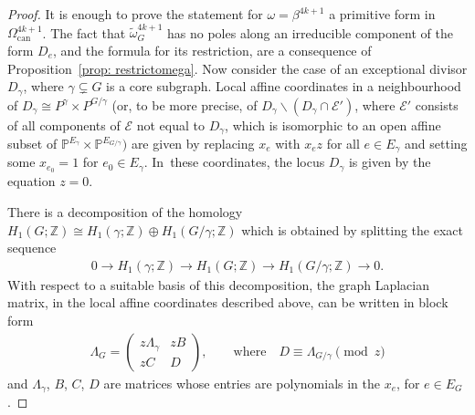 \documentclass[pdftex]{sigma}%
\numberwithin{equation}{section}
\newcommand{\To}{\longrightarrow}
\newcommand{\Z}{\mathbb Z}
\newcommand{\Pro}{\mathbb P}
\newcommand{\can}{\mathrm{can}}
\newcommand{\0}{\color{blue}{\mathsf{0}}}
\begin{document}
\begin{proof} It is enough to prove the statement for $\omega = \beta^{4k+1}$ a primitive form in $\Omega^{4k+1}_{\can}$. The fact that $\widetilde{\omega}^{4k+1}_G$ has no poles along an irreducible component of the form $D_e$, and the formula for its restriction,
are a consequence of Proposition~\ref{prop: restrictomega}. Now consider the case of an exceptional divisor $D_{\gamma}$, where $\gamma \subsetneq G$ is a core subgraph.
Local affine coordinates in a neighbourhood of $D_{\gamma} \cong P^{\gamma} \times P^{G/\gamma}$ \big(or, to be more precise, of $D_{\gamma}\backslash (D_{\gamma} \cap \mathcal{E}')$, where $\mathcal{E'}$ consists of all components of $\mathcal{E}$ not equal to $D_{\gamma}$, which is isomorphic to an open affine subset of $\Pro^{E_{\gamma}} \times \Pro^{E_{G/\gamma}}\big)$ are given by replacing $x_{e}$ with $x_{e} z$ for all $e\in E_{\gamma}$ \cite[Section~5.3]{Cosmic} and setting some $x_{e_0}=1$ for $e_0 \in E_{\gamma}$. In~these coordinates, the locus $D_{\gamma}$ is given by the equation $z=0$.

There is a decomposition of the homology
$H_1(G; \Z) \cong H_1(\gamma; \Z) \oplus H_1(G/\gamma;\Z)$
which is obtained by splitting the exact sequence
\begin{gather*}
0 \To H_1(\gamma;\Z) \To H_1(G;\Z) \To H_1(G/\gamma; \Z) \To 0 .
\end{gather*}
With respect to a suitable basis of this decomposition, the graph Laplacian matrix, in the local affine coordinates described above, can be written in block form
\begin{gather*}
\Lambda_G = \begin{pmatrix} z \Lambda_{\gamma} & z B \\ z C & D \end{pmatrix}\!, \qquad \text{where} \quad D \equiv \Lambda_{G/\gamma} \pmod{z}
\end{gather*}
and $\Lambda_{\gamma}$, $B$, $C$, $D$ are matrices whose entries are polynomials in the $x_e$, for $e \in E_G$.



\end{proof}
\end{document}
